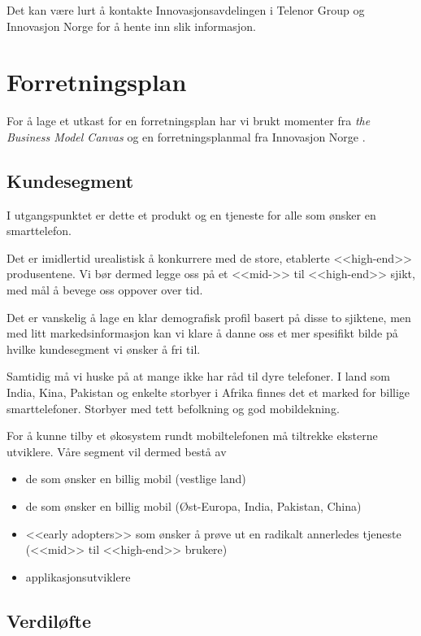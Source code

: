 Det kan være lurt å kontakte Innovasjonsavdelingen i Telenor Group og
Innovasjon Norge for å hente inn slik informasjon.

\section{Forretningsplan}

For å lage et utkast for en forretningsplan har vi brukt momenter fra
\textit{the Business Model Canvas} \cite{osterwalder} og en forretningsplanmal
fra Innovasjon Norge \cite{innovasjon.norge}. 

\subsection{Kundesegment}

I utgangspunktet er dette et produkt og en tjeneste for alle som ønsker en
smarttelefon.

Det er imidlertid urealistisk å konkurrere med de store, etablerte <<high-end>>
produsentene.  Vi bør dermed legge oss på et <<mid->> til <<high-end>> sjikt,
med mål å bevege oss oppover over tid.

Det er vanskelig å lage en klar demografisk profil basert på disse to
sjiktene, men med litt markedsinformasjon kan vi klare å danne oss et mer
spesifikt bilde på hvilke kundesegment vi ønsker å fri til.

Samtidig må vi huske på at mange ikke har råd til dyre telefoner. I land som
India, Kina, Pakistan og enkelte storbyer i Afrika finnes det et marked for
billige smarttelefoner. Storbyer med tett befolkning og god mobildekning.

For å kunne tilby et økosystem rundt mobiltelefonen må tiltrekke eksterne
utviklere.  Våre segment vil dermed bestå av
%
\begin{itemize}
  \item de som ønsker en billig mobil (vestlige land)
  \item de som ønsker en billig mobil (Øst-Europa, India, Pakistan, China)
  \item <<early adopters>> som ønsker å prøve ut en radikalt annerledes
    tjeneste (<<mid>> til <<high-end>> brukere)
  \item applikasjonsutviklere
\end{itemize}

\subsection{Verdiløfte}

